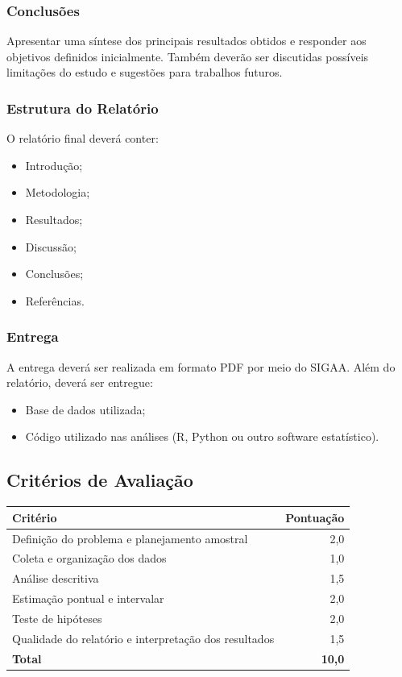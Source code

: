 \documentclass[
  letterpaper,
  DIV=11,
  numbers=noendperiod]{scrreprt}
\providecommand{\tightlist}{%
  \setlength{\itemsep}{0pt}\setlength{\parskip}{0pt}}\usepackage{longtable,booktabs,array}
\begin{document}
\subsubsection{Conclusões}\label{conclusuxf5es}

Apresentar uma síntese dos principais resultados obtidos e responder aos
objetivos definidos inicialmente. Também deverão ser discutidas
possíveis limitações do estudo e sugestões para trabalhos futuros.

\subsubsection{Estrutura do Relatório}\label{estrutura-do-relatuxf3rio}

O relatório final deverá conter:

\begin{itemize}
\tightlist
\item
  Introdução;
\item
  Metodologia;
\item
  Resultados;
\item
  Discussão;
\item
  Conclusões;
\item
  Referências.
\end{itemize}

\subsubsection{Entrega}\label{entrega}

A entrega deverá ser realizada em formato PDF por meio do SIGAA. Além do
relatório, deverá ser entregue:

\begin{itemize}
\tightlist
\item
  Base de dados utilizada;
\item
  Código utilizado nas análises (R, Python ou outro software
  estatístico).
\end{itemize}

\subsection{Critérios de
Avaliação}\label{crituxe9rios-de-avaliauxe7uxe3o-1}

\begin{longtable}[]{@{}lr@{}}
\toprule\noalign{}
Critério & Pontuação \\
\midrule\noalign{}
\endhead
\bottomrule\noalign{}
\endlastfoot
Definição do problema e planejamento amostral & 2,0 \\
Coleta e organização dos dados & 1,0 \\
Análise descritiva & 1,5 \\
Estimação pontual e intervalar & 2,0 \\
Teste de hipóteses & 2,0 \\
Qualidade do relatório e interpretação dos resultados & 1,5 \\
\textbf{Total} & \textbf{10,0} \\
\end{longtable}
\end{document}

